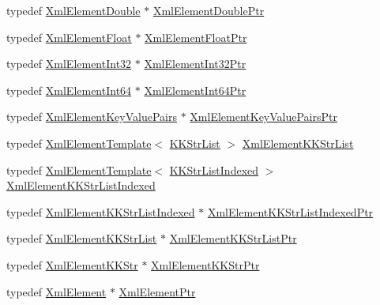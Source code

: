 \begin{DoxyCompactItemize}
typedef \hyperlink{class_k_k_b_1_1_xml_element_double}{Xml\+Element\+Double} $\ast$ \hyperlink{namespace_k_k_b_a2b0fe9de3a44a3ec2fcaa779cb1b728f}{Xml\+Element\+Double\+Ptr}
\item 
typedef \hyperlink{class_k_k_b_1_1_xml_element_float}{Xml\+Element\+Float} $\ast$ \hyperlink{namespace_k_k_b_af6e477e83a6849fc80fc90d8825dde20}{Xml\+Element\+Float\+Ptr}
\item 
typedef \hyperlink{class_k_k_b_1_1_xml_element_int32}{Xml\+Element\+Int32} $\ast$ \hyperlink{namespace_k_k_b_aff7fa8ba87251c175155c585c355d591}{Xml\+Element\+Int32\+Ptr}
\item 
typedef \hyperlink{class_k_k_b_1_1_xml_element_int64}{Xml\+Element\+Int64} $\ast$ \hyperlink{namespace_k_k_b_ab249ee3d7ebb47ff0b787fc3bfbfc4a0}{Xml\+Element\+Int64\+Ptr}
\item 
typedef \hyperlink{class_k_k_b_1_1_xml_element_key_value_pairs}{Xml\+Element\+Key\+Value\+Pairs} $\ast$ \hyperlink{namespace_k_k_b_a5c3670747a7bb32d79c02d2629327430}{Xml\+Element\+Key\+Value\+Pairs\+Ptr}
\item 
typedef \hyperlink{class_k_k_b_1_1_xml_element_template}{Xml\+Element\+Template}$<$ \hyperlink{class_k_k_b_1_1_k_k_str_list}{K\+K\+Str\+List} $>$ \hyperlink{namespace_k_k_b_a200e36b6739def59860c742eb8168484}{Xml\+Element\+K\+K\+Str\+List}
\item 
typedef \hyperlink{class_k_k_b_1_1_xml_element_template}{Xml\+Element\+Template}$<$ \hyperlink{class_k_k_b_1_1_k_k_str_list_indexed}{K\+K\+Str\+List\+Indexed} $>$ \hyperlink{namespace_k_k_b_ae29919a9a9a3ffa88c3b4757aba6b15e}{Xml\+Element\+K\+K\+Str\+List\+Indexed}
\item 
typedef \hyperlink{namespace_k_k_b_ae29919a9a9a3ffa88c3b4757aba6b15e}{Xml\+Element\+K\+K\+Str\+List\+Indexed} $\ast$ \hyperlink{namespace_k_k_b_ae7d01c7c01d751e247ed5fdd17cd32ee}{Xml\+Element\+K\+K\+Str\+List\+Indexed\+Ptr}
\item 
typedef \hyperlink{namespace_k_k_b_a200e36b6739def59860c742eb8168484}{Xml\+Element\+K\+K\+Str\+List} $\ast$ \hyperlink{namespace_k_k_b_affffa9607088c1e3243e714ae30e163d}{Xml\+Element\+K\+K\+Str\+List\+Ptr}
\item 
typedef \hyperlink{class_k_k_b_1_1_xml_element_k_k_str}{Xml\+Element\+K\+K\+Str} $\ast$ \hyperlink{namespace_k_k_b_a73ff4cfe89efeb8a79c57512bcb503d0}{Xml\+Element\+K\+K\+Str\+Ptr}
\item 
typedef \hyperlink{class_k_k_b_1_1_xml_element}{Xml\+Element} $\ast$ \hyperlink{namespace_k_k_b_a60c0ababc47c146b900507f7a3d3872e}{Xml\+Element\+Ptr}

\end{DoxyCompactItemize}
